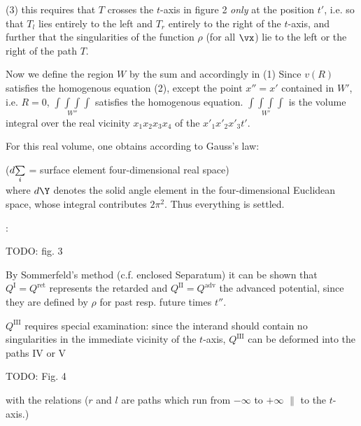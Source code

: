 (3) this requires that $T$ crosses the $t$-axis in figure 2 \textit{only} at the position $t'$, i.e. so that $T_l$ lies entirely to the left and $T_r$ entirely to the right of the $t$-axis, and further that the singularities of the function $\rho$ (for all $\vx$) lie to the left or the right of the path $T$.

Now we define the region $W$ by the sum
and accordingly in (1)
Since $v(R)$ satisfies the homogenous equation (2), except the point $x''=x'$ contained in $W'$, i.e. $R=0$, $\underset{W''}{\int\int\int\int}$ satisfies the homogenous equation. $\underset{W'}{\int\int\int\int}$ is the volume integral over the real vicinity $x_1 x_2 x_3 x_4$ of the  $x'_1 x'_2 x'_3 t'$.

For this real volume, one obtains according to Gauss's law:

(${d\underset{i}{\sum}}$ = surface element four-dimensional real space)\\
where ${d\Y}$ denotes the solid angle element in the four-dimensional Euclidean space, whose integral contributes $2\pi^2$. Thus everything is settled.

:

TODO: fig. 3

By Sommerfeld's method (c.f. enclosed Separatum) it can be shown that $Q^\text{I} = Q^\text{ret}$ represents the retarded and $Q^\text{II}=Q^\text{adv}$ the advanced potential, since they are defined by $\rho$ for past resp. future times $t''$.

$Q^\text{III}$ requires special examination: since the interand should contain no singularities in the immediate vicinity of the $t$-axis, $Q^\text{III}$ can be  deformed into the paths IV or V

TODO: Fig. 4

with the relations
($r$ and $l$ are paths which run from $-\infty$ to $+\infty$ $\parallel$ to the $t$-axis.)

